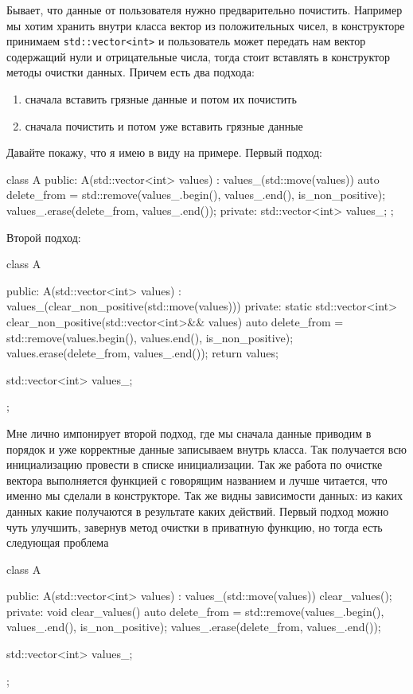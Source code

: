Бывает, что данные от пользователя нужно предварительно почистить.
Например мы хотим хранить внутри класса вектор из положительных чисел, в конструкторе принимаем \verb"std::vector<int>" и пользователь может передать нам вектор содержащий нули и отрицательные числа, тогда стоит вставлять в конструктор методы очистки данных.
Причем есть два подхода:
\begin{enumerate}
\item сначала вставить грязные данные и потом их почистить

\item сначала почистить и потом уже вставить грязные данные
\end{enumerate}
Давайте покажу, что я имею в виду на примере.
Первый подход:
\begin{cppcode}
class A {
public:
  A(std::vector<int> values)
   : values_(std::move(values)) {
    auto delete_from =
        std::remove(values_.begin(), values_.end(), is_non_positive);
    values_.erase(delete_from, values_.end());
  }
private:
  std::vector<int> values_;
};
\end{cppcode}
Второй подход:
\begin{cppcode}
class A {
public:
  A(std::vector<int> values)
   : values_(clear_non_positive(std::move(values))) {}
private:
  static std::vector<int> clear_non_positive(std::vector<int>&& values) {
    auto delete_from = std::remove(values.begin(), values.end(), is_non_positive);
    values.erase(delete_from, values_.end());
    return values;
  }

  std::vector<int> values_;
};
\end{cppcode}
Мне лично импонирует второй подход, где мы сначала данные приводим в порядок и уже корректные данные записываем внутрь класса.
Так получается всю инициализацию провести в списке инициализации.
Так же работа по очистке вектора выполняется функцией с говорящим названием и лучше читается, что именно мы сделали в конструкторе.
Так же видны зависимости данных: из каких данных какие получаются в результате каких действий.
Первый подход можно чуть улучшить, завернув метод очистки в приватную функцию, но тогда есть следующая проблема
\begin{cppcode}
class A {
public:
  A(std::vector<int> values)
   : values_(std::move(values)) {
    clear_values();
  }
private:
  void clear_values() {
    auto delete_from =
        std::remove(values_.begin(), values_.end(), is_non_positive);
    values_.erase(delete_from, values_.end());
  }

  std::vector<int> values_;
};
\end{cppcode}
